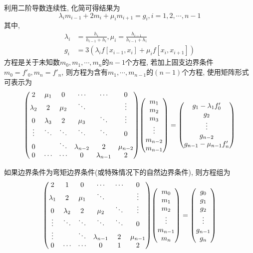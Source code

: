 利用二阶导数连续性, 化简可得结果为
\begin{equation}\label{eqn:2.8.9}
    \lambda_im_{i-1}+2m_i+\mu_im_{i+1}=g_i, i=1,2,\cdots,n-1
\end{equation}
其中,
\begin{align*}
    \lambda_i&=\frac{h_i}{h_{i-1}+h_i}, \mu_i=\frac{h_{i-1}}{h_{i-1}+h_i}\\
    g_i&=3(\lambda_if[x_{i-1},x_i]+\mu_if[x_i,x_{i+1}])
\end{align*}
方程是关于未知数$m_0,m_1,\cdots,m_n$的$n-1$个方程, 若加上固支边界条件$m_0=f'_0, m_n=f'_n$, 则方程为含有$m_1,\cdots,m_{n-1}$的$(n-1)$个方程, 使用矩阵形式可表示为
\begin{equation*}
    \mqty(2&\mu_1&0&\cdots&\cdots&0\\
    \lambda_2&2&\mu_2&\ddots&&\vdots\\
    0&\lambda_3&2&\mu_3&\ddots&\vdots\\
    \vdots&\ddots&\ddots&\ddots&\ddots&0\\
    0&&\ddots&\lambda_{n-2}&2&\mu_{n-2}\\
    0&\cdots&\cdots&0&\lambda_{n-1}&2)\mqty(m_1\\m_2\\m_3\\\vdots\\m_{n-2}\\m_{n-1})=
    \mqty(g_1-\lambda_1f'_0\\g_2\\\vdots\\g_{n-2}\\g_{n-1}-\mu_{n-1}f'_n)
\end{equation*}

如果边界条件为弯矩边界条件(或特殊情况下的自然边界条件), 则方程组为
\begin{equation*}
    \mqty(
        2&1&0&\cdots&\cdots&0\\
        \lambda_1&2&\mu_1&\ddots& &\vdots\\
        0&\lambda_2&2&\mu_2&\ddots&\vdots\\
        \vdots&\ddots&\ddots&\ddots&\ddots&0\\
        \vdots& &\ddots&\lambda_{n-1}&2&\mu_{n-1}\\
        0&\cdots&\cdots&0&1&2
    )\mqty(m_0\\m_1\\m_2\\\vdots\\m_{n-1}\\m_n)=\mqty(g_0\\g_1\\g_2\\\vdots\\g_{n-1}\\g_n)
\end{equation*}

